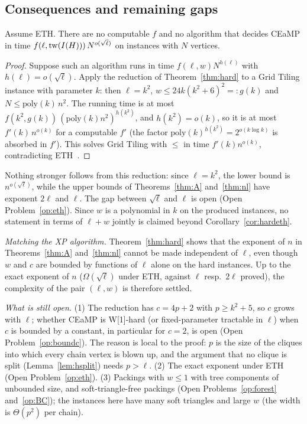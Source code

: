 \subsection{Consequences and remaining gaps}
\begin{corollary}\label{cor:hardeth}
Assume ETH. There are no computable $f$ and no algorithm that decides CEaMP in time $f(\ell,\mathrm{tw}(I(H)))\,N^{o(\sqrt\ell)}$ on instances with $N$ vertices.
\end{corollary}
\begin{proof}
Suppose such an algorithm runs in time $f(\ell,w)N^{h(\ell)}$ with $h(\ell)=o(\sqrt\ell)$. Apply the reduction of Theorem~\ref{thm:hard} to a Grid Tiling instance with parameter $k$: then $\ell=k^2$, $w\le 24k(k^2+6)^2=:g(k)$ and $N\le \mathrm{poly}(k)\,n^2$. The running time is at most $f(k^2,g(k))\,(\mathrm{poly}(k)n^2)^{h(k^2)}$, and $h(k^2)=o(k)$, so it is at most $f'(k)\,n^{o(k)}$ for a computable $f'$ (the factor $\mathrm{poly}(k)^{h(k^2)}=2^{o(k\log k)}$ is absorbed in $f'$). This solves Grid Tiling with $\le$ in time $f'(k)n^{o(k)}$, contradicting ETH~\cite{Cygan15}.
\end{proof}
Nothing stronger follows from this reduction: since $\ell=k^2$, the lower bound is $n^{o(\sqrt\ell)}$, while the upper bounds of Theorems~\ref{thm:A} and~\ref{thm:nl} have exponent $2\ell$ and $\ell$. The gap between $\sqrt\ell$ and $\ell$ is open (Open Problem~\ref{op:eth}). Since $w$ is a polynomial in $k$ on the produced instances, no statement in terms of $\ell+w$ jointly is claimed beyond Corollary~\ref{cor:hardeth}.

\emph{Matching the XP algorithm.} Theorem~\ref{thm:hard} shows that the exponent of $n$ in Theorems~\ref{thm:A} and~\ref{thm:nl} cannot be made independent of $\ell$, even though $w$ and $c$ are bounded by functions of $\ell$ alone on the hard instances. Up to the exact exponent of $n$ ($\Omega(\sqrt\ell)$ under ETH, against $\ell$ resp.\ $2\ell$ proved), the complexity of the pair $(\ell,w)$ is therefore settled.

\emph{What is still open.} (1) The reduction has $c=4p+2$ with $p\ge k^2+5$, so $c$ grows with $\ell$; whether CEaMP is W[1]-hard (or fixed-parameter tractable in $\ell$) when $c$ is bounded by a constant, in particular for $c=2$, is open (Open Problem~\ref{op:boundc}). The reason is local to the proof: $p$ is the size of the cliques into which every chain vertex is blown up, and the argument that no clique is split (Lemma~\ref{lem:hsplit}) needs $p>\ell$. (2) The exact exponent under ETH (Open Problem~\ref{op:eth}). (3) Packings with $w\le1$ with tree components of unbounded size, and soft-triangle-free packings (Open Problems~\ref{op:forest} and~\ref{op:BC}); the instances here have many soft triangles and large $w$ (the width is $\Theta(p^2)$ per chain).


